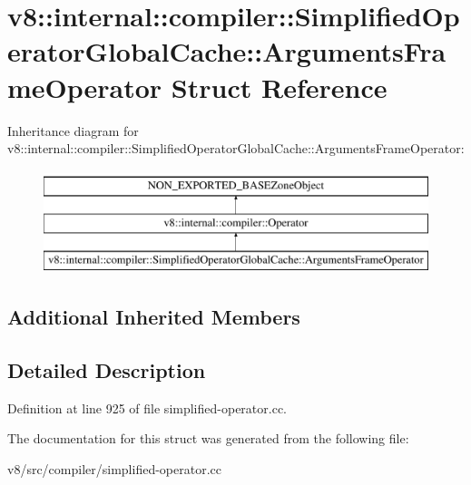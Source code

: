 \hypertarget{structv8_1_1internal_1_1compiler_1_1SimplifiedOperatorGlobalCache_1_1ArgumentsFrameOperator}{}\section{v8\+:\+:internal\+:\+:compiler\+:\+:Simplified\+Operator\+Global\+Cache\+:\+:Arguments\+Frame\+Operator Struct Reference}
\label{structv8_1_1internal_1_1compiler_1_1SimplifiedOperatorGlobalCache_1_1ArgumentsFrameOperator}
Inheritance diagram for v8\+:\+:internal\+:\+:compiler\+:\+:Simplified\+Operator\+Global\+Cache\+:\+:Arguments\+Frame\+Operator\+:\begin{figure}[H]
\begin{center}
\leavevmode
\includegraphics[height=3.000000cm]{structv8_1_1internal_1_1compiler_1_1SimplifiedOperatorGlobalCache_1_1ArgumentsFrameOperator}
\end{center}
\end{figure}
\subsection*{Additional Inherited Members}


\subsection{Detailed Description}


Definition at line 925 of file simplified-\/operator.\+cc.



The documentation for this struct was generated from the following file\+:\begin{DoxyCompactItemize}
\item 
v8/src/compiler/simplified-\/operator.\+cc\end{DoxyCompactItemize}
